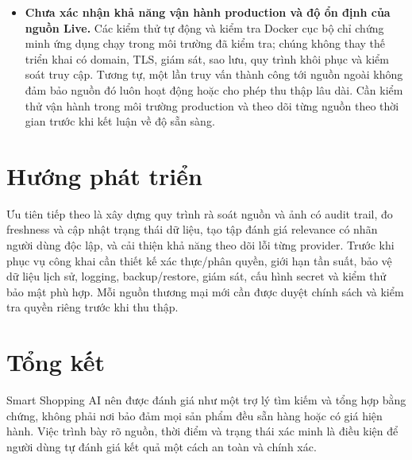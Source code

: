 \begin{itemize}
  \item \textbf{Chưa xác nhận khả năng vận hành production và độ ổn định của nguồn Live.} Các kiểm thử tự động và kiểm tra Docker cục bộ chỉ chứng minh ứng dụng chạy trong môi trường đã kiểm tra; chúng không thay thế triển khai có domain, TLS, giám sát, sao lưu, quy trình khôi phục và kiểm soát truy cập. Tương tự, một lần truy vấn thành công tới nguồn ngoài không đảm bảo nguồn đó luôn hoạt động hoặc cho phép thu thập lâu dài. Cần kiểm thử vận hành trong môi trường production và theo dõi từng nguồn theo thời gian trước khi kết luận về độ sẵn sàng.
\end{itemize}

\section{Hướng phát triển}

Ưu tiên tiếp theo là xây dựng quy trình rà soát nguồn và ảnh có audit trail, đo freshness và cập nhật trạng thái dữ liệu, tạo tập đánh giá relevance có nhãn người dùng độc lập, và cải thiện khả năng theo dõi lỗi từng provider. Trước khi phục vụ công khai cần thiết kế xác thực/phân quyền, giới hạn tần suất, bảo vệ dữ liệu lịch sử, logging, backup/restore, giám sát, cấu hình secret và kiểm thử bảo mật phù hợp. Mỗi nguồn thương mại mới cần được duyệt chính sách và kiểm tra quyền riêng trước khi thu thập.

\section{Tổng kết}

Smart Shopping AI nên được đánh giá như một trợ lý tìm kiếm và tổng hợp bằng chứng, không phải nơi bảo đảm mọi sản phẩm đều sẵn hàng hoặc có giá hiện hành. Việc trình bày rõ nguồn, thời điểm và trạng thái xác minh là điều kiện để người dùng tự đánh giá kết quả một cách an toàn và chính xác.
